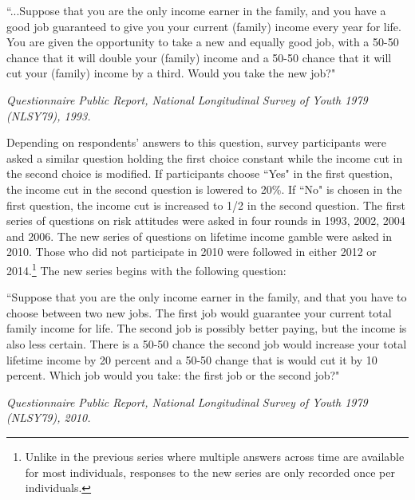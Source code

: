 \documentclass[emulatestandardclasses, 10pt, abstract = true]{scrartcl}
\begin{document}
\begin{center}
	\begin{minipage}[!h]{.9\linewidth}\small
		``...Suppose that you are the only income earner in the family, and you have a good job guaranteed to give you your current (family) income every year for life. You are given the opportunity to take a new and equally good job, with a 50-50 chance that it will double your (family) income and a 50-50 chance that it will cut your (family) income by a third. Would you take the new job?"
	\end{minipage}
\end{center}
\begin{flushright}
	\textit{Questionnaire Public Report, National Longitudinal Survey of Youth 1979 (NLSY79), 1993.}
\end{flushright}
Depending on respondents' answers to this question, survey participants were asked a similar question holding the first choice constant while the income cut in the second choice is modified. If participants choose ``Yes" in the first question, the income cut in the second question is lowered to 20\%. If ``No" is chosen in the first question, the income cut is increased to 1/2 in the second question. The first series of questions on risk attitudes were asked in four rounds in 1993, 2002, 2004 and 2006. The new series of questions on lifetime income gamble were asked in 2010. Those who did not participate in 2010 were followed in either 2012 or 2014.\footnote{Unlike in the previous series where multiple answers across time are available for most individuals, responses to the new series are only recorded once per individuals.} The new series begins with the following question:
\begin{center}
	\begin{minipage}[!h]{.9\linewidth}\small
		``Suppose that you are the only income earner in the family, and that you have to choose between two new jobs. The first job would guarantee your current total family income for life. The second job is possibly better paying, but the income is also less certain. There is a 50-50 chance the second job would increase your total lifetime income by 20 percent and a 50-50 change that is would cut it by 10 percent. Which job would you take: the first job or the second job?"
	\end{minipage}
\end{center}
\begin{flushright}
	\textit{Questionnaire Public Report, National Longitudinal Survey of Youth 1979 (NLSY79), 2010.}
\end{flushright} 
\end{document}
